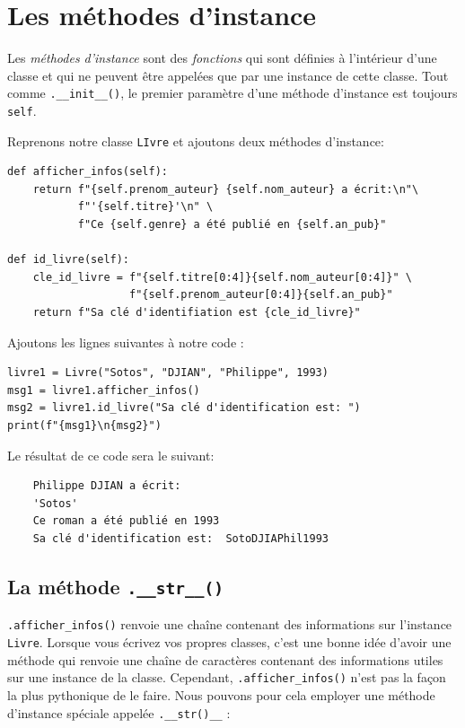 \documentclass[a4paper,11pt]{book}
\begin{document}
\section{Les méthodes d'instance}
Les \textit{méthodes d'instance} sont des \textit{fonctions} qui sont définies à l'intérieur d'une classe et qui ne peuvent être appelées que par une instance de cette classe. Tout comme \texttt{.\_\_init\_\_()}, le premier paramètre d'une méthode d'instance est toujours \texttt{self}.
\medskip

Reprenons notre classe \texttt{LIvre} et ajoutons deux méthodes d'instance:
\begin{lstlisting}[caption=Méthodes d'instance]
def afficher_infos(self):
    return f"{self.prenom_auteur} {self.nom_auteur} a écrit:\n"\
           f"'{self.titre}'\n" \
           f"Ce {self.genre} a été publié en {self.an_pub}"

def id_livre(self):
    cle_id_livre = f"{self.titre[0:4]}{self.nom_auteur[0:4]}" \
                   f"{self.prenom_auteur[0:4]}{self.an_pub}"
    return f"Sa clé d'identifiation est {cle_id_livre}"
\end{lstlisting}
\medskip

Ajoutons les lignes suivantes à notre code :
\begin{lstlisting}[caption=Accéder aux méthodes d'instance]
livre1 = Livre("Sotos", "DJIAN", "Philippe", 1993)
msg1 = livre1.afficher_infos()
msg2 = livre1.id_livre("Sa clé d'identification est: ")
print(f"{msg1}\n{msg2}")
\end{lstlisting}
\medskip

Le résultat de ce code sera le suivant:
\begin{verbatim}
    Philippe DJIAN a écrit:
    'Sotos'
    Ce roman a été publié en 1993
    Sa clé d'identification est:  SotoDJIAPhil1993
\end{verbatim}
\medskip

\subsection*{La méthode \texttt{.\_\_str\_\_()}}
\texttt{.afficher\_infos()} renvoie une chaîne contenant des informations sur l'instance \texttt{Livre}. Lorsque vous écrivez vos propres classes, c'est une bonne idée d'avoir une méthode qui renvoie une chaîne de caractères contenant des informations utiles sur une instance de la classe. Cependant, \texttt{.afficher\_infos()} n'est pas la façon la plus pythonique de le faire. Nous pouvons pour cela employer une méthode d’instance spéciale appelée \texttt{.\_\_str()\_\_} :
\medskip
\end{document}
